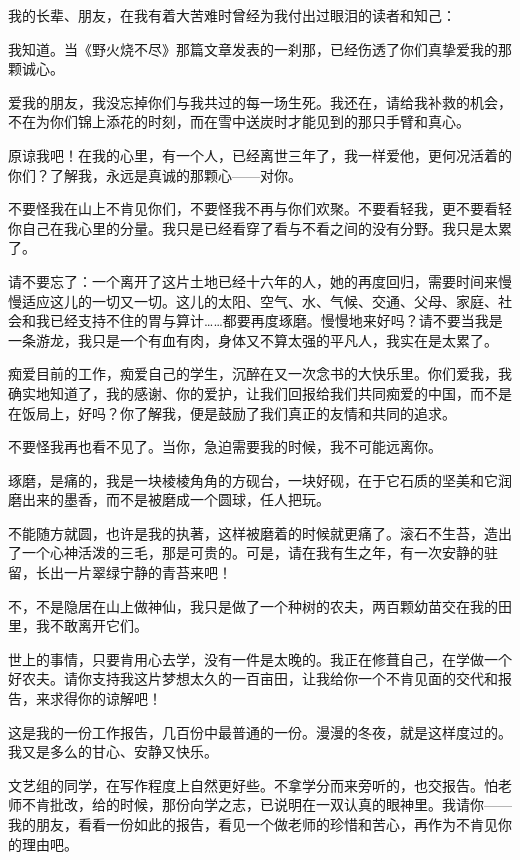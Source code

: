 \par 我的长辈、朋友，在我有着大苦难时曾经为我付出过眼泪的读者和知己：
\par 我知道。当《野火烧不尽》那篇文章发表的一刹那，已经伤透了你们真挚爱我的那颗诚心。
\par 爱我的朋友，我没忘掉你们与我共过的每一场生死。我还在，请给我补救的机会，不在为你们锦上添花的时刻，而在雪中送炭时才能见到的那只手臂和真心。
\par 原谅我吧！在我的心里，有一个人，已经离世三年了，我一样爱他，更何况活着的你们？了解我，永远是真诚的那颗心——对你。
\par 不要怪我在山上不肯见你们，不要怪我不再与你们欢聚。不要看轻我，更不要看轻你自己在我心里的分量。我只是已经看穿了看与不看之间的没有分野。我只是太累了。
\par 请不要忘了：一个离开了这片土地已经十六年的人，她的再度回归，需要时间来慢慢适应这儿的一切又一切。这儿的太阳、空气、水、气候、交通、父母、家庭、社会和我已经支持不住的胃与算计……都要再度琢磨。慢慢地来好吗？请不要当我是一条游龙，我只是一个有血有肉，身体又不算太强的平凡人，我实在是太累了。
\par 痴爱目前的工作，痴爱自己的学生，沉醉在又一次念书的大快乐里。你们爱我，我确实地知道了，我的感谢、你的爱护，让我们回报给我们共同痴爱的中国，而不是在饭局上，好吗？你了解我，便是鼓励了我们真正的友情和共同的追求。
\par 不要怪我再也看不见了。当你，急迫需要我的时候，我不可能远离你。
\par 琢磨，是痛的，我是一块棱棱角角的方砚台，一块好砚，在于它石质的坚美和它润磨出来的墨香，而不是被磨成一个圆球，任人把玩。
\par 不能随方就圆，也许是我的执著，这样被磨着的时候就更痛了。滚石不生苔，造出了一个心神活泼的三毛，那是可贵的。可是，请在我有生之年，有一次安静的驻留，长出一片翠绿宁静的青苔来吧！
\par 不，不是隐居在山上做神仙，我只是做了一个种树的农夫，两百颗幼苗交在我的田里，我不敢离开它们。
\par 世上的事情，只要肯用心去学，没有一件是太晚的。我正在修葺自己，在学做一个好农夫。请你支持我这片梦想太久的一百亩田，让我给你一个不肯见面的交代和报告，来求得你的谅解吧！
\par 这是我的一份工作报告，几百份中最普通的一份。漫漫的冬夜，就是这样度过的。我又是多么的甘心、安静又快乐。
\par 文艺组的同学，在写作程度上自然更好些。不拿学分而来旁听的，也交报告。怕老师不肯批改，给的时候，那份向学之志，已说明在一双认真的眼神里。我请你——我的朋友，看看一份如此的报告，看见一个做老师的珍惜和苦心，再作为不肯见你的理由吧。
